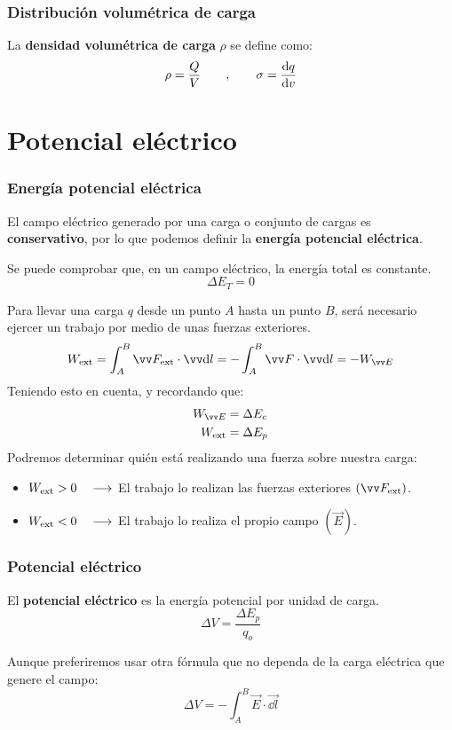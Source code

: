 \documentclass[a4paper]{book}
\begin{document}
\subsubsection{Distribución volumétrica de carga}
La \textbf{densidad volumétrica de carga} $\rho$ se define como:
\[\rho = \frac{Q}{V}\qquad ,\qquad \sigma = \dv{q}{v}\]

\section{Potencial eléctrico}
\subsubsection{Energía potencial eléctrica}
El campo eléctrico generado por una carga o conjunto de cargas es \textbf{conservativo}, por lo que podemos definir la \textbf{energía potencial eléctrica}.

Se puede comprobar que, en un campo eléctrico, la energía total es constante.
\[\Delta E_T = 0\]

Para llevar una carga $q$ desde un punto $A$ hasta un punto $B$, será necesario ejercer un trabajo por medio de unas fuerzas exteriores.
\[W\subtext{ext} = \int_A^B\vec{F}\subtext{ext}\cdot \vec{\dd l}=-\int_A^B\vec{F}\cdot \vec{\dd l}=-W_{\vec{E}}\]
Teniendo esto en cuenta, y recordando que:
\begin{align*}
	W_{\vec{E}}    & = \Delta E_c \\
	W\subtext{ext} & = \Delta E_p
\end{align*}
Podremos determinar quién está realizando una fuerza sobre nuestra carga:
\begin{itemize}
	\item $W_{\text{ext}}>0\quad \longrightarrow $ El trabajo lo realizan las fuerzas exteriores $\left( \vec{F}\subtext{ext} \right)$.
	\item $W_{\text{ext}}<0\quad \longrightarrow $ El trabajo lo realiza el propio campo $\left( \vec{E} \right)$.
\end{itemize}

\subsubsection{Potencial eléctrico}
El \textbf{potencial eléctrico} es la energía potencial por unidad de carga.
\[\Delta V = \frac{\Delta E_p}{q_o}\]

Aunque preferiremos usar otra fórmula que no dependa de la carga eléctrica que genere el campo:
\[\boxed{\Delta V = -\int_A^B\vec{E}\cdot \vec{\dd l}}\]
\end{document}
